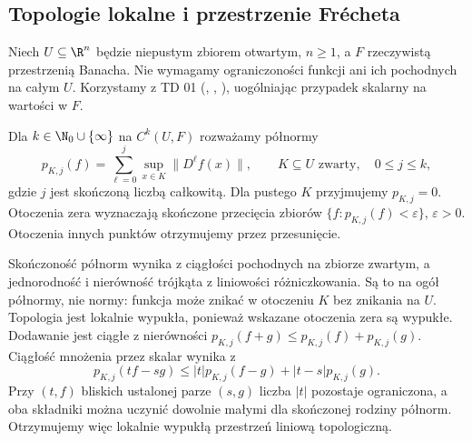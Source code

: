 \subsection{Topologie lokalne i przestrzenie Frécheta}

Niech $U\subseteq\R^n$ będzie niepustym zbiorem
otwartym, $n\ge1$, a $F$ rzeczywistą przestrzenią
Banacha. Nie wymagamy ograniczoności funkcji ani
ich pochodnych na całym $U$. Korzystamy z TD 01
(,
,
), uogólniając
przypadek skalarny na wartości w $F$.

\begin{definicja}
\label{ma2:def:ck-local}
Dla $k\in\N_0\cup\{\infty\}$ na $C^k(U,F)$
rozważamy półnormy
\[
 p_{K,j}(f)=\sum_{\ell=0}^j\sup_{x\in K}
                     \|D^\ell f(x)\|,
 \qquad K\subseteq U\text{ zwarty},\quad 0\le j\le k,
\]
gdzie $j$ jest skończoną liczbą całkowitą.
Dla pustego $K$ przyjmujemy $p_{K,j}=0$.
Otoczenia zera wyznaczają skończone przecięcia
zbiorów $\{f:p_{K,j}(f)<\varepsilon\}$,
$\varepsilon>0$. Otoczenia innych punktów
otrzymujemy przez przesunięcie.
\end{definicja}

Skończoność półnorm wynika z ciągłości pochodnych
na zbiorze zwartym, a jednorodność i nierówność
trójkąta z liniowości różniczkowania.
Są to na ogół półnormy, nie normy: funkcja
może znikać w otoczeniu $K$ bez znikania na $U$.
Topologia jest lokalnie wypukła, ponieważ
wskazane otoczenia zera są wypukłe.
Dodawanie jest ciągłe z nierówności
$p_{K,j}(f+g)\le p_{K,j}(f)+p_{K,j}(g)$.
Ciągłość mnożenia przez skalar wynika z
\[
 p_{K,j}(tf-sg)
 \le |t|p_{K,j}(f-g)+|t-s|p_{K,j}(g).
\]
Przy $(t,f)$ bliskich ustalonej parze $(s,g)$
liczba $|t|$ pozostaje ograniczona, a oba
składniki można uczynić dowolnie małymi
dla skończonej rodziny półnorm. Otrzymujemy
więc lokalnie wypukłą przestrzeń liniową
topologiczną.

